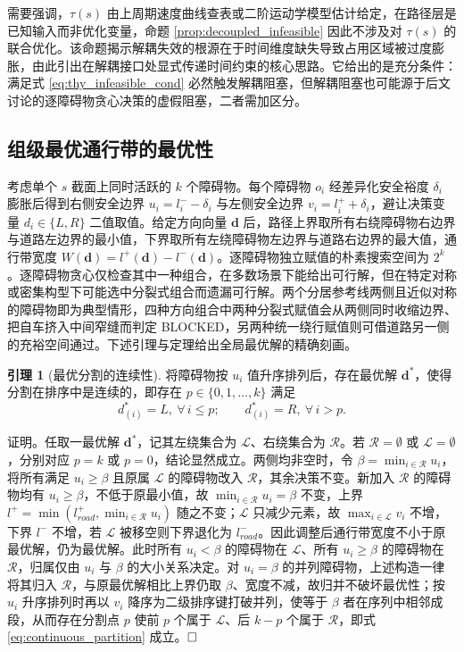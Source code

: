 \documentclass[a4paper,11pt]{ctexart}
\theoremstyle{definition}
\newtheorem{lemma}{引理}[section]
\begin{document}
需要强调，$\tau(s)$ 由上周期速度曲线查表或二阶运动学模型估计给定，在路径层是已知输入而非优化变量，命题 \ref{prop:decoupled_infeasible} 因此不涉及对 $\tau(s)$ 的联合优化。该命题揭示解耦失效的根源在于时间维度缺失导致占用区域被过度膨胀，由此引出在解耦接口处显式传递时间约束的核心思路。它给出的是充分条件：满足式 \eqref{eq:thy_infeasible_cond} 必然触发解耦阻塞，但解耦阻塞也可能源于后文讨论的逐障碍物贪心决策的虚假阻塞，二者需加区分。

\subsection{组级最优通行带的最优性}
\label{sec:thy_max_gap}

考虑单个 $s$ 截面上同时活跃的 $k$ 个障碍物。每个障碍物 $o_i$ 经差异化安全裕度 $\delta_i$ 膨胀后得到右侧安全边界 $u_i = l_i^{-} - \delta_i$ 与左侧安全边界 $v_i = l_i^{+} + \delta_i$，避让决策变量 $d_i \in \{L, R\}$ 二值取值。给定方向向量 $\mathbf{d}$ 后，路径上界取所有右绕障碍物右边界与道路左边界的最小值，下界取所有左绕障碍物左边界与道路右边界的最大值，通行带宽度 $W(\mathbf{d}) = l^{+}(\mathbf{d}) - l^{-}(\mathbf{d})$。逐障碍物独立赋值的朴素搜索空间为 $2^k$。逐障碍物贪心仅检查其中一种组合，在多数场景下能给出可行解，但在特定对称或密集构型下可能选中分裂式组合而遗漏可行解。两个分居参考线两侧且近似对称的障碍物即为典型情形，四种方向组合中两种分裂式赋值会从两侧同时收缩边界、把自车挤入中间窄缝而判定 BLOCKED，另两种统一绕行赋值则可借道路另一侧的充裕空间通过。下述引理与定理给出全局最优解的精确刻画。

\begin{lemma}[最优分割的连续性]
\label{lem:continuous_partition}
将障碍物按 $u_i$ 值升序排列后，存在最优解 $\mathbf{d}^{*}$，使得分割在排序中是连续的，即存在 $p \in \{0, 1, \ldots, k\}$ 满足
\begin{equation}
    d_{(i)}^{*} = L,\ \forall\, i \leq p; \qquad d_{(i)}^{*} = R,\ \forall\, i > p.
    \label{eq:continuous_partition}
\end{equation}
\end{lemma}

证明。任取一最优解 $\mathbf{d}^{*}$，记其左绕集合为 $\mathcal{L}$、右绕集合为 $\mathcal{R}$。若 $\mathcal{R}=\emptyset$ 或 $\mathcal{L}=\emptyset$，分别对应 $p=k$ 或 $p=0$，结论显然成立。两侧均非空时，令 $\beta = \min_{i \in \mathcal{R}} u_i$，将所有满足 $u_i \geq \beta$ 且原属 $\mathcal{L}$ 的障碍物改入 $\mathcal{R}$，其余决策不变。新加入 $\mathcal{R}$ 的障碍物均有 $u_i \geq \beta$，不低于原最小值，故 $\min_{i \in \mathcal{R}} u_i = \beta$ 不变，上界 $l^{+} = \min(l_{road}^{+}, \min_{i\in\mathcal{R}} u_i)$ 随之不变；$\mathcal{L}$ 只减少元素，故 $\max_{i \in \mathcal{L}} v_i$ 不增，下界 $l^{-}$ 不增，若 $\mathcal{L}$ 被移空则下界退化为 $l_{road}^{-}$。因此调整后通行带宽度不小于原最优解，仍为最优解。此时所有 $u_i < \beta$ 的障碍物在 $\mathcal{L}$、所有 $u_i \geq \beta$ 的障碍物在 $\mathcal{R}$，归属仅由 $u_i$ 与 $\beta$ 的大小关系决定。对 $u_i = \beta$ 的并列障碍物，上述构造一律将其归入 $\mathcal{R}$，与原最优解相比上界仍取 $\beta$、宽度不减，故归并不破坏最优性；按 $u_i$ 升序排列时再以 $v_i$ 降序为二级排序键打破并列，使等于 $\beta$ 者在序列中相邻成段，从而存在分割点 $p$ 使前 $p$ 个属于 $\mathcal{L}$、后 $k-p$ 个属于 $\mathcal{R}$，即式 \eqref{eq:continuous_partition} 成立。$\hfill\Box$
\end{document}
